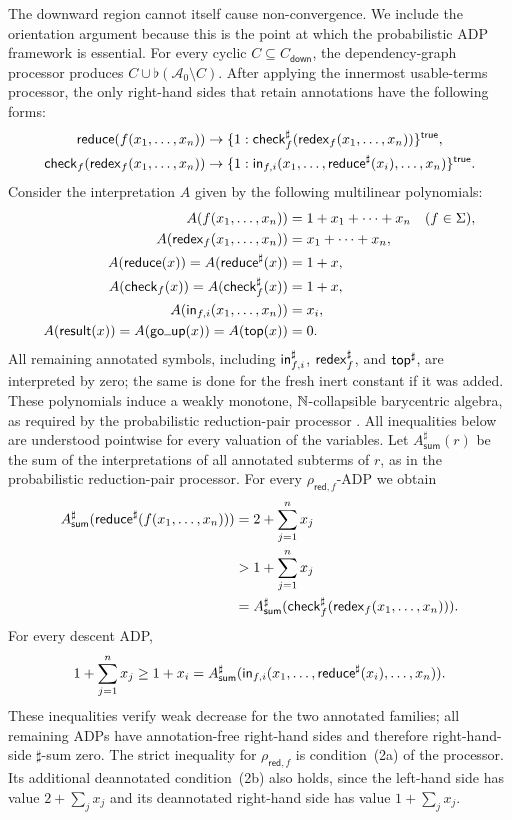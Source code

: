The downward region cannot itself cause non-convergence.  We include the
orientation argument because this is the point at which the probabilistic ADP
framework is essential.  For every cyclic
\(C\subseteq C_{\mathsf{down}}\), the dependency-graph processor produces
\(C\cup\flat(\mathcal A_0\setminus C)\).  After applying the innermost
usable-terms processor, the only right-hand sides that retain annotations have
the following forms:
\[
  \begin{aligned}
    \mathsf{reduce}(f(x_1,\ldots,x_n))
      &\to\{1:\mathsf{check}_f^{\sharp}(
        \mathsf{redex}_f(x_1,\ldots,x_n))\}^{\mathsf{true}},\\
    \mathsf{check}_f(\mathsf{redex}_f(x_1,\ldots,x_n))
      &\to\{1:\mathsf{in}_{f,i}(x_1,\ldots,
        \mathsf{reduce}^{\sharp}(x_i),\ldots,x_n)\}^{\mathsf{true}}.
  \end{aligned}
\]
Consider the interpretation \(A\) given by the following multilinear
polynomials:
\begin{align*}
  A(f(x_1,\ldots,x_n))
    &=1+x_1+\cdots+x_n &&(f\in\Sigma),\\
  A(\tredex_f(x_1,\ldots,x_n))
    &=x_1+\cdots+x_n,\\
  A(\treduce(x))=A(\treduce^{\sharp}(x))
    &=1+x,\\
  A(\tcheck_f(x))=A(\tcheck_f^{\sharp}(x))
    &=1+x,\\
  A(\tin_{f,i}(x_1,\ldots,x_n))
    &=x_i,\\
  A(\tresult(x))=A(\tgoup(x))=A(\ttop(x))
    &=0.
\end{align*}
All remaining annotated symbols, including
\(\mathsf{in}_{f,i}^{\sharp}\), \(\mathsf{redex}_f^{\sharp}\), and
\(\mathsf{top}^{\sharp}\), are interpreted by zero; the same is done for the fresh
inert constant if it was added.  These polynomials induce a weakly monotone,
\(\mathbb{N}\)-collapsible barycentric algebra, as required by the probabilistic
reduction-pair processor
\cite[Sec.~4.4]{kassing_giesl_2026_adp}.  All inequalities below are understood
pointwise for every valuation of the variables.  Let
\(A^{\sharp}_{\mathsf{sum}}(r)\) be the sum of the interpretations of all
annotated subterms of \(r\), as in the probabilistic reduction-pair processor.
For every \(\rho_{\mathsf{red},f}\)-ADP we obtain
\[
  \begin{aligned}
    A^{\sharp}_{\mathsf{sum}}(
      \mathsf{reduce}^{\sharp}(f(x_1,\ldots,x_n)))
      &=2+\sum_{j=1}^{n}x_j\\
      &>1+\sum_{j=1}^{n}x_j\\
      &=A^{\sharp}_{\mathsf{sum}}(
        \mathsf{check}_f^{\sharp}(\mathsf{redex}_f(x_1,\ldots,x_n))).
  \end{aligned}
\]
For every descent ADP,
\[
  1+\sum_{j=1}^{n}x_j
  \geq 1+x_i
  =A^{\sharp}_{\mathsf{sum}}(
    \mathsf{in}_{f,i}(x_1,\ldots,
      \mathsf{reduce}^{\sharp}(x_i),\ldots,x_n)).
\]
These inequalities verify weak decrease for the two annotated families; all
remaining ADPs have annotation-free right-hand sides and therefore
right-hand-side \(\sharp\)-sum zero.  The strict inequality for
\(\rho_{\mathsf{red},f}\) is condition~(2a) of the processor.  Its additional
deannotated condition~(2b) also holds, since the left-hand side has value
\(2+\sum_jx_j\) and its deannotated right-hand side has value
\(1+\sum_jx_j\).

